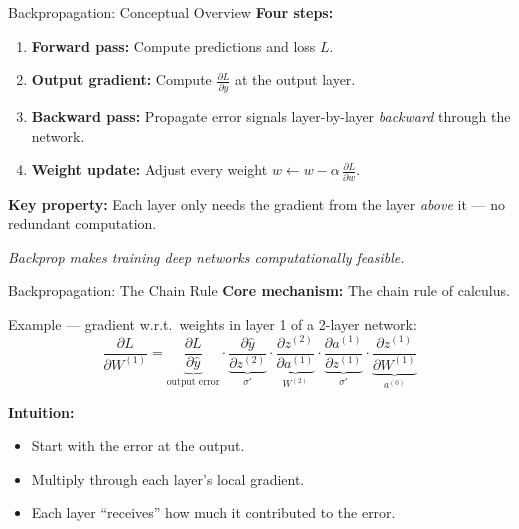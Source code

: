 \documentclass[10pt]{beamer}
\begin{document}
\begin{frame}{Backpropagation: Conceptual Overview}
    \textbf{Four steps:}
    \begin{enumerate}
        \item \textbf{Forward pass:} Compute predictions and loss $L$.
        \item \textbf{Output gradient:} Compute $\frac{\partial L}{\partial \hat{y}}$ at the output layer.
        \item \textbf{Backward pass:} Propagate error signals layer-by-layer \emph{backward} through the network.
        \item \textbf{Weight update:} Adjust every weight $w \gets w - \alpha\,\frac{\partial L}{\partial w}$.
    \end{enumerate}

    \vspace{0.2cm}
    \textbf{Key property:} Each layer only needs the gradient from the layer \emph{above} it --- no redundant computation.

    \vspace{0.2cm}
    \textit{Backprop makes training deep networks computationally feasible.}
\end{frame}

\begin{frame}{Backpropagation: The Chain Rule}
    \textbf{Core mechanism:} The chain rule of calculus.

    \vspace{0.2cm}
    Example --- gradient w.r.t.\ weights in layer 1 of a 2-layer network:
    \[
        \frac{\partial L}{\partial W^{(1)}} =
        \underbrace{\frac{\partial L}{\partial \hat{y}}}_{\text{output error}}
        \cdot
        \underbrace{\frac{\partial \hat{y}}{\partial z^{(2)}}}_{\sigma'}
        \cdot
        \underbrace{\frac{\partial z^{(2)}}{\partial a^{(1)}}}_{{W^{(2)}}}
        \cdot
        \underbrace{\frac{\partial a^{(1)}}{\partial z^{(1)}}}_{\sigma'}
        \cdot
        \underbrace{\frac{\partial z^{(1)}}{\partial W^{(1)}}}_{a^{(0)}}
    \]

    \vspace{0.2cm}
    \textbf{Intuition:}
    \begin{itemize}
        \item Start with the error at the output.
        \item Multiply through each layer's local gradient.
        \item Each layer ``receives'' how much it contributed to the error.
    \end{itemize}
\end{frame}
\end{document}
